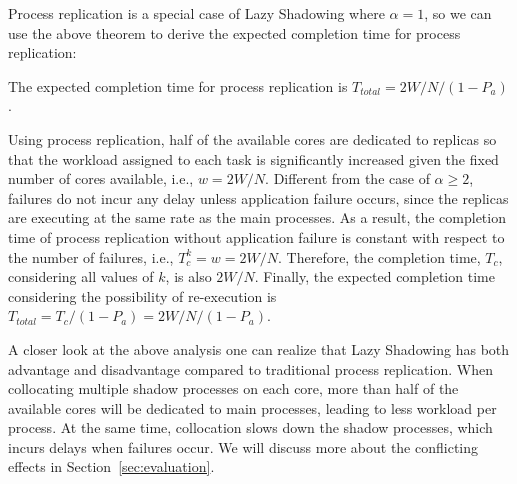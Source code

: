 Process replication is a special case of Lazy Shadowing where $\alpha=1$, so we can use the above theorem to derive the expected completion time for process replication:

\begin{corollary}
The expected completion time for process replication is $T_{total} = 2W/N / (1 - P_a)$.
\end{corollary}
\begin{IEEEproof}
Using process replication, half of the available cores are dedicated to replicas so that the workload assigned to each task is significantly increased given the fixed number of cores available, i.e., $w=2W/N$. Different from the case of $\alpha \ge 2$, failures do not incur any delay unless application failure occurs, since the replicas are executing at the same rate as the main processes. As a result, the completion time of process replication without application failure is constant with respect to the number of failures, i.e., $T_c^k=w=2W/N$. Therefore, the completion time, $T_c$, considering all values of $k$, is also $2W/N$. Finally, the expected completion time considering the possibility of re-execution is $T_{total} = T_c / (1 - P_a) = 2W/N / (1 - P_a)$.
\end{IEEEproof}

A closer look at the above analysis one can realize that Lazy Shadowing has both advantage and disadvantage compared to traditional process replication. When collocating multiple shadow processes on each core, more than half of the available cores will be dedicated to main processes, leading to less workload per process. At the same time, collocation slows down the shadow processes, which incurs delays when failures occur. We will discuss more about the conflicting effects in Section~\ref{sec:evaluation}.







